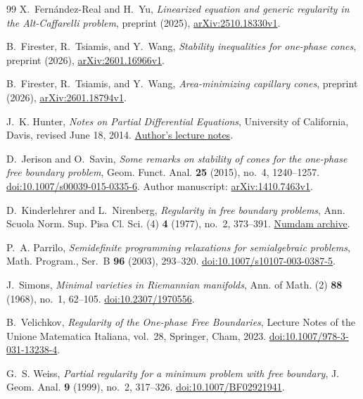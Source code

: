 \begin{thebibliography}{99}
X.~Fern\'andez-Real and H.~Yu,
\emph{Linearized equation and generic regularity in the Alt-Caffarelli problem},
preprint (2025),
\href{https://arxiv.org/abs/2510.18330v1}{arXiv:2510.18330v1}.

B.~Firester, R.~Tsiamis, and Y.~Wang,
\emph{Stability inequalities for one-phase cones},
preprint (2026),
\href{https://arxiv.org/abs/2601.16966v1}{arXiv:2601.16966v1}.

B.~Firester, R.~Tsiamis, and Y.~Wang,
\emph{Area-minimizing capillary cones},
preprint (2026),
\href{https://arxiv.org/abs/2601.18794v1}{arXiv:2601.18794v1}.

J.~K. Hunter,
\emph{Notes on Partial Differential Equations},
University of California, Davis, revised June 18, 2014.
\href{https://www.math.ucdavis.edu/~hunter/pdes/pde_notes.pdf}{Author's lecture notes}.

D.~Jerison and O.~Savin,
\emph{Some remarks on stability of cones for the one-phase free boundary problem},
Geom. Funct. Anal. \textbf{25} (2015), no.~4, 1240--1257.
\href{https://doi.org/10.1007/s00039-015-0335-6}{doi:10.1007/s00039-015-0335-6}.
Author manuscript: \href{https://arxiv.org/abs/1410.7463v1}{arXiv:1410.7463v1}.

D.~Kinderlehrer and L.~Nirenberg,
\emph{Regularity in free boundary problems},
Ann. Scuola Norm. Sup. Pisa Cl. Sci. (4) \textbf{4} (1977), no.~2, 373--391.
\href{https://www.numdam.org/item/ASNSP_1977_4_4_2_373_0/}{Numdam archive}.

P.~A. Parrilo,
\emph{Semidefinite programming relaxations for semialgebraic problems},
Math. Program., Ser.~B \textbf{96} (2003), 293--320.
\href{https://doi.org/10.1007/s10107-003-0387-5}{doi:10.1007/s10107-003-0387-5}.

J.~Simons,
\emph{Minimal varieties in Riemannian manifolds},
Ann. of Math. (2) \textbf{88} (1968), no.~1, 62--105.
\href{https://doi.org/10.2307/1970556}{doi:10.2307/1970556}.

B.~Velichkov,
\emph{Regularity of the One-phase Free Boundaries},
Lecture Notes of the Unione Matematica Italiana, vol.~28,
Springer, Cham, 2023.
\href{https://doi.org/10.1007/978-3-031-13238-4}{doi:10.1007/978-3-031-13238-4}.

G.~S. Weiss,
\emph{Partial regularity for a minimum problem with free boundary},
J. Geom. Anal. \textbf{9} (1999), no.~2, 317--326.
\href{https://doi.org/10.1007/BF02921941}{doi:10.1007/BF02921941}.

\end{thebibliography}
